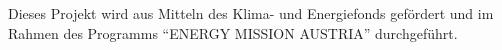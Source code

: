 Dieses Projekt wird aus Mitteln des Klima- und Energiefonds gefördert und im Rahmen des Programms ``ENERGY MISSION AUSTRIA'' durchgeführt.
